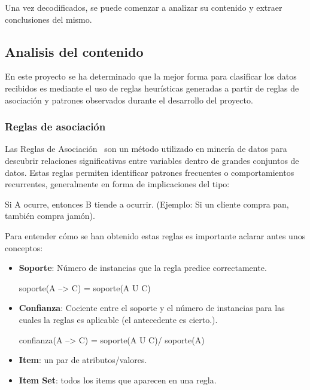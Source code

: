 
Una vez decodificados, se puede comenzar a analizar su contenido y extraer conclusiones del mismo.

\subsection{Analisis del contenido}
En este proyecto se ha determinado que la mejor forma para clasificar los datos recibidos es mediante el uso de reglas heurísticas generadas a partir de reglas de asociación y patrones observados durante el desarrollo del proyecto.

\subsubsection{Reglas de asociación}
Las Reglas de Asociación~\cite{DTM:Rules} son un método utilizado en minería de datos para descubrir relaciones significativas entre variables dentro de grandes conjuntos de datos. Estas reglas permiten identificar patrones frecuentes o comportamientos recurrentes, generalmente en forma de implicaciones del tipo:

Si A ocurre, entonces B tiende a ocurrir.
(Ejemplo: Si un cliente compra pan, también compra jamón).

Para entender cómo se han obtenido estas reglas es importante aclarar antes unos conceptos:


\begin{itemize}
    \item \textbf{Soporte}: Número de instancias que la regla predice correctamente.
    
    soporte(A --> C) = soporte(A U C)
    
    \item \textbf{Confianza}: Cociente entre el soporte y el número de instancias para las cuales la reglas es aplicable (el antecedente es cierto.).
    
    confianza(A --> C) = soporte(A U C)/ soporte(A)
    
    \item \textbf{Item}: un par de atributos/valores.

    \item \textbf{Item Set}:  todos los items que aparecen en una regla.
    
\end{itemize}

